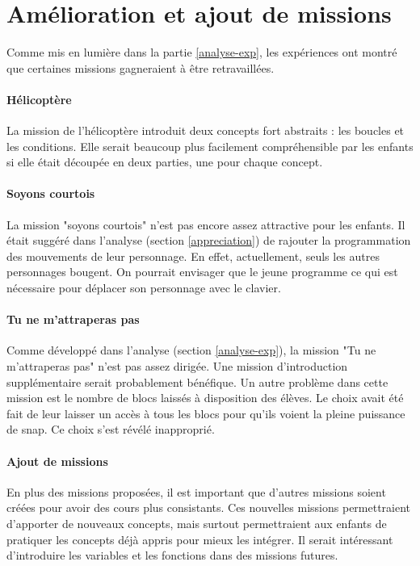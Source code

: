 \section{Amélioration et ajout de missions}
Comme mis en lumière dans la partie \ref{analyse-exp}, les expériences ont montré que certaines \glspl{mission} gagneraient à être retravaillées.

\paragraph{Hélicoptère}
La \gls{mission} de l'hélicoptère introduit deux concepts fort abstraits : les boucles et les conditions. Elle serait beaucoup plus facilement compréhensible par les enfants si elle était découpée en deux parties, une pour chaque concept.

\paragraph{Soyons courtois}
La \gls{mission} "soyons courtois" n'est pas encore assez attractive pour les enfants. Il était suggéré dans l'analyse (section \ref{appreciation}) de rajouter la programmation des mouvements de leur personnage. En effet, actuellement, seuls les autres personnages bougent. On pourrait envisager que le jeune programme ce qui est nécessaire pour déplacer son personnage avec le clavier.

\paragraph{Tu ne m'attraperas pas}
Comme développé dans l'analyse (section \ref{analyse-exp}), la \gls{mission} "Tu ne m'attraperas pas" n'est pas assez dirigée. Une \gls{mission} d'introduction supplémentaire serait probablement bénéfique. Un autre problème dans cette \gls{mission} est le nombre de \glspl{bloc}  laissés à disposition des élèves. Le choix avait été fait de leur laisser un accès à tous les \glspl{bloc}  pour qu'ils voient la pleine puissance de \gls{snap}. Ce choix s'est révélé inapproprié.

\paragraph{Ajout de missions}
En plus des \glspl{mission} proposées, il est important que d'autres \glspl{mission} soient créées pour avoir des cours plus consistants. Ces nouvelles \glspl{mission} permettraient d'apporter de nouveaux concepts, mais surtout permettraient aux enfants de pratiquer les concepts déjà appris pour mieux les intégrer. Il serait intéressant d'introduire les variables et les fonctions dans des \glspl{mission} futures.

